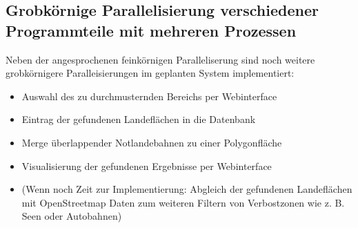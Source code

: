 \documentclass[
11pt, %
a4paper, %
oneside, %
pdfspacing, %
headinclude,
BCOR5mm, %
ngerman, %
bibtotocnumbered,
]{scrartcl}
\begin{document}
\subsection{Grobkörnige Parallelisierung verschiedener Programmteile mit mehreren Prozessen}
Neben der angesprochenen feinkörnigen Paralleliserung sind noch weitere grobkörnigere Paralleisierungen im geplanten System implementiert:
\begin{itemize}
	\item Auswahl des zu durchmusternden Bereichs per Webinterface
	\item Eintrag der gefundenen Landeflächen in die Datenbank 
	\item Merge überlappender Notlandebahnen zu einer Polygonfläche
	\item Visualisierung der gefundenen Ergebnisse per Webinterface
	\item (Wenn noch Zeit zur Implementierung: Abgleich der gefundenen Landeflächen mit OpenStreetmap Daten zum weiteren Filtern von Verbostzonen wie z. B. Seen oder Autobahnen)
\end{itemize}
\end{document}
